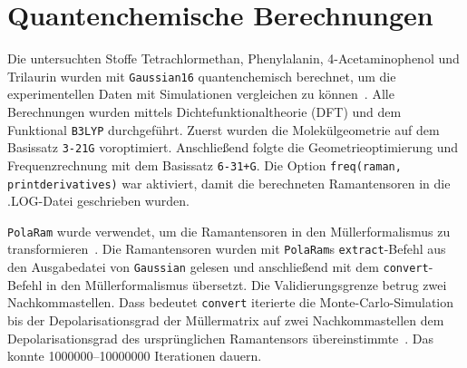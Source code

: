 \documentclass[a4paper,12pt,twoside,parskip=no,headsepline,open=right,ngerman,export]{scrreprt}
\begin{document}
        \section{Quantenchemische Berechnungen}
            Die untersuchten Stoffe Tetrachlormethan, Phenylalanin, 4-Acetaminophenol und Trilaurin wurden mit \texttt{Gaussian16} quantenchemisch berechnet, um die experimentellen Daten mit Simulationen vergleichen zu können~\cite{frisch_gaussian_2016}. Alle Berechnungen wurden mittels Dichtefunktionaltheorie (DFT) und dem Funktional \texttt{B3LYP} durchgeführt. Zuerst wurden die Molekülgeometrie auf dem Basissatz \texttt{3-21G} voroptimiert. Anschließend folgte die Geometrieoptimierung und Frequenzrechnung mit dem Basissatz \texttt{6-31+G\te{*}}. Die Option \texttt{freq(raman, \linebreak printderivatives)} war aktiviert, damit die berechneten Ramantensoren in die .LOG-Datei geschrieben wurden.
            
            \texttt{PolaRam} wurde verwendet, um die Ramantensoren in den Müllerformalismus zu transformieren~\cite{eichhorn_polaram_2020}. Die Ramantensoren wurden mit \texttt{PolaRam}s \texttt{extract}-Befehl aus den Ausgabedatei von \texttt{Gaussian} gelesen und anschließend mit dem \texttt{convert}-Befehl in den Müllerformalismus übersetzt. Die Validierungsgrenze betrug zwei Nachkommastellen. Dass bedeutet \texttt{convert} iterierte die Monte-Carlo-Simulation bis der Depolarisationsgrad der Müllermatrix auf zwei Nachkommastellen dem Depolarisationsgrad des ursprünglichen Ramantensors übereinstimmte~\cite{eichhorn_polaram_2020, eichhorn_beschreibung_2020}. Das konnte \numrange{1000000}{10000000} Iterationen dauern.
\end{document}
